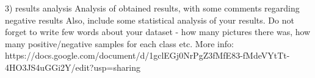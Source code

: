 \documentclass[a4paper, 11pt]{article}
\begin{document}
3) results analysis
Analysis of obtained results, with some comments regarding negative results Also, include some statistical analysis of your results. Do not forget to write few words about your dataset - how many pictures there was, how many positive/negative samples for each class etc. More info: https://docs.google.com/document/d/1gclEGj0NrPgZ3fMfE83-fMdeVYtTt-4HO3JS4uGGi2Y/edit?usp=sharing
\end{document}
